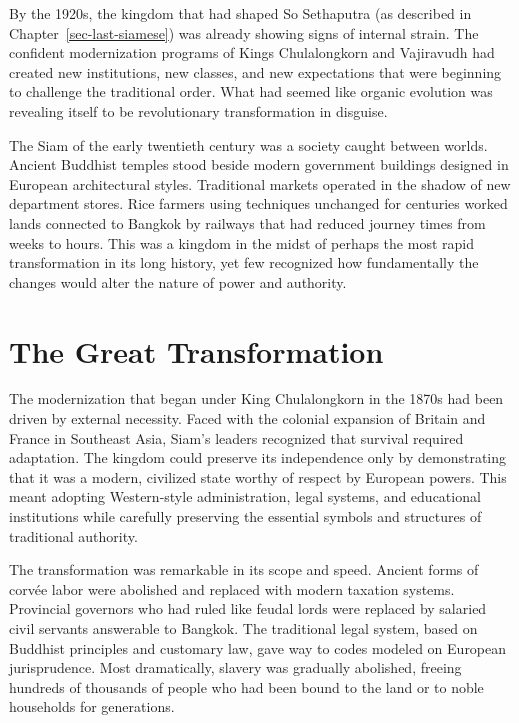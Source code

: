 \documentclass[
  Letterpaper,
]{scrbook}
\begin{document}
By the 1920s, the kingdom that had shaped So Sethaputra (as described in
Chapter~\ref{sec-last-siamese}) was already showing signs of internal
strain. The confident modernization programs of Kings Chulalongkorn and
Vajiravudh had created new institutions, new classes, and new
expectations that were beginning to challenge the traditional order.
What had seemed like organic evolution was revealing itself to be
revolutionary transformation in disguise.

The Siam of the early twentieth century was a society caught between
worlds. Ancient Buddhist temples stood beside modern government
buildings designed in European architectural styles. Traditional markets
operated in the shadow of new department stores. Rice farmers using
techniques unchanged for centuries worked lands connected to Bangkok by
railways that had reduced journey times from weeks to hours. This was a
kingdom in the midst of perhaps the most rapid transformation in its
long history, yet few recognized how fundamentally the changes would
alter the nature of power and authority.

\section{The Great Transformation}\label{the-great-transformation}

The modernization that began under King Chulalongkorn in the 1870s had
been driven by external necessity. Faced with the colonial expansion of
Britain and France in Southeast Asia, Siam's leaders recognized that
survival required adaptation. The kingdom could preserve its
independence only by demonstrating that it was a modern, civilized state
worthy of respect by European powers. This meant adopting Western-style
administration, legal systems, and educational institutions while
carefully preserving the essential symbols and structures of traditional
authority.

The transformation was remarkable in its scope and speed. Ancient forms
of corvée labor were abolished and replaced with modern taxation
systems. Provincial governors who had ruled like feudal lords were
replaced by salaried civil servants answerable to Bangkok. The
traditional legal system, based on Buddhist principles and customary
law, gave way to codes modeled on European jurisprudence. Most
dramatically, slavery was gradually abolished, freeing hundreds of
thousands of people who had been bound to the land or to noble
households for generations.
\end{document}
